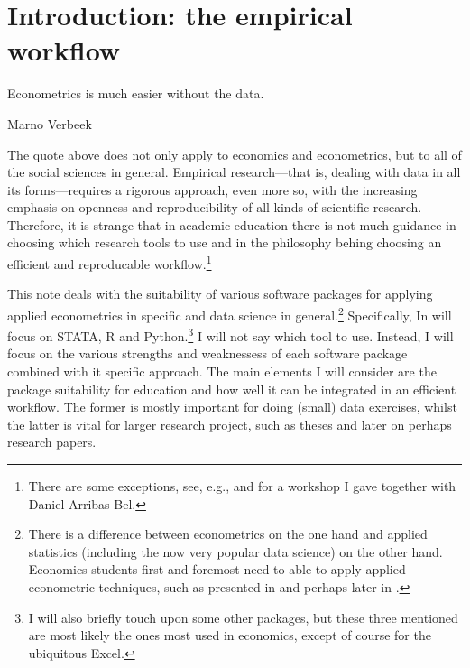 \documentclass[fleqn,10pt]{SelfArx} %
\affiliation{\textsuperscript{1}\textit{Department of Spatial Economics, Vrije Universiteit Amsterdam, Amsterdam, The Netherlands}} %
\affiliation{*\textbf{Corresponding author}: \Letter{} t.de.graaff@vu.nl; \Mundus{} \href{thomasdegraaff.nl}{thomasdegraaff.nl}} %
\begin{document}
\maketitle %
\thispagestyle{empty} %


\section*{Introduction: the empirical workflow} %

\epigraph{Econometrics is much easier without the data.}{Marno Verbeek}

The quote above does not only apply to economics and econometrics, but to all of
the social sciences in general. Empirical research---that is, dealing with data in
all its forms---requires a rigorous approach, even more so, with the increasing
emphasis on openness and reproducibility of all kinds of scientific research. Therefore, it is strange
that in academic education there is not much guidance in choosing which research tools to
use and in the philosophy behing choosing an efficient and reproducable
workflow.\footnote{There are some exceptions, see, e.g.,
  \citet{healy2011choosing} and \citet{Arribas-Bel2014misc} for a workshop I gave together with Daniel Arribas-Bel.}

This note deals with the suitability of various software packages for applying
applied econometrics in specific and data science in general.\footnote{There
  is a difference between econometrics on the one hand and applied statistics (including the now very popular data science) on the other hand. Economics students first and foremost need to able to apply
  applied econometric techniques, such as presented in \citet{stock2007introduction} and perhaps later in
  \citet{angrist2008mostly}.}
Specifically, In will focus on STATA, R and Python.\footnote{I will also briefly
  touch upon some other packages, but these three mentioned are most likely the
  ones most used in economics, except of course for the ubiquitous Excel.}
I will not say which tool to use. Instead, I will focus on the various strengths
and weaknessess of each software package combined with it specific approach. The
main elements I will consider are the package suitability for education and how
well it can be integrated in an efficient workflow. The former is mostly
important for doing (small) data exercises, whilst the latter is vital for
larger research project, such as theses and later on perhaps research papers.  
\end{document}
